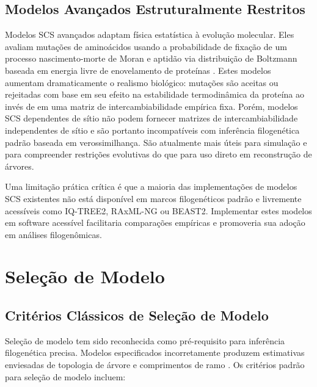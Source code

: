 \subsection{Modelos Avançados Estruturalmente Restritos}

Modelos SCS avançados adaptam física estatística à evolução molecular. Eles avaliam mutações de aminoácidos usando a probabilidade de fixação de um processo nascimento-morte de Moran e aptidão via distribuição de Boltzmann baseada em energia livre de enovelamento de proteínas \parencite{ferreiro2026}. Estes modelos aumentam dramaticamente o realismo biológico: mutações são aceitas ou rejeitadas com base em seu efeito na estabilidade termodinâmica da proteína ao invés de em uma matriz de intercambiabilidade empírica fixa. Porém, modelos SCS dependentes de sítio não podem fornecer matrizes de intercambiabilidade independentes de sítio e são portanto incompatíveis com inferência filogenética padrão baseada em verossimilhança. São atualmente mais úteis para simulação e para compreender restrições evolutivas do que para uso direto em reconstrução de árvores.

Uma limitação prática crítica é que a maioria das implementações de modelos SCS existentes não está disponível em marcos filogenéticos padrão e livremente acessíveis como IQ-TREE2, RAxML-NG ou BEAST2. Implementar estes modelos em software acessível facilitaria comparações empíricas e promoveria sua adoção em análises filogenômicas.

\section{Seleção de Modelo}

\subsection{Critérios Clássicos de Seleção de Modelo}

Seleção de modelo tem sido reconhecida como pré-requisito para inferência filogenética precisa. Modelos especificados incorretamente produzem estimativas enviesadas de topologia de árvore e comprimentos de ramo \parencite{buckley2002,sanderson2002,abadi2019}. Os critérios padrão para seleção de modelo incluem:

